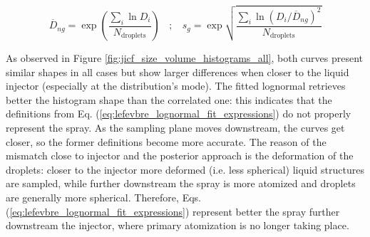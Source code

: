 %
\begin{equation}
\label{eq:lefevbre_lognormal_fit_expressions}
\overline{D}_{ng} = \exp \left(  \frac{\sum_i \ln D_i }{N_\mathrm{droplets}} \right)  ~~~~ ; ~~~~ 
s_g = \exp \sqrt{  \frac{\sum_i \ln \left( D_i / \overline{D}_{ng} \right) ^2 }{N_\mathrm{droplets}} }
\end{equation}

As observed in Figure \ref{fig:jicf_size_volume_histograms_all}, both curves present similar shapes in all cases but show larger differences when closer to the liquid injector (especially at the distribution's mode). The fitted lognormal retrieves better the histogram shape than the correlated one: this indicates that the definitions from Eq. (\ref{eq:lefevbre_lognormal_fit_expressions}) do not properly represent the spray.  As the sampling plane moves downstream, the curves get closer, so the former definitions become more accurate. The reason of the mismatch close to injector and the posterior approach is the deformation of the droplets: closer to the injector more deformed (i.e. less spherical) liquid structures are sampled, while further downstream the spray is more atomized and droplets are generally more spherical. Therefore, Eqs. (\ref{eq:lefevbre_lognormal_fit_expressions}) represent better the spray further downstream the injector, where primary atomization is no longer taking place.



\clearpage


